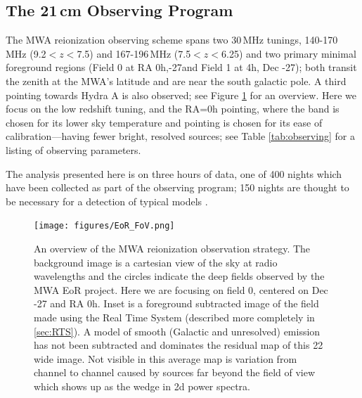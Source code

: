 \documentclass[twolcolumn,iop]{emulateapj}
\begin{document}
\subsection{The 21\,cm Observing Program}
The MWA reionization observing scheme spans two 30\,MHz tunings, 140-170\,MHz (9.2$<z<$7.5) and 167-196\,MHz (7.5$<z<$6.25) and two primary minimal foreground regions (Field 0 at RA 0h,-27\arcdeg and Field 1 at 4h, Dec -27\arcdeg); both transit the zenith at the MWA's  latitude and are near the south galactic pole. A third pointing towards Hydra A is also observed; see Figure \ref{fig:fields} for an overview. Here we focus on the low redshift tuning, and the RA=0h pointing, where the band is chosen for its lower sky temperature and pointing is chosen for its ease of calibration---having fewer bright, resolved sources; see Table \ref{tab:observing} for a listing of observing parameters.

The analysis presented here is on three hours of data, one of 400 nights which have been collected as part of the observing program; 150 nights are thought to be necessary for a detection of typical models \citep{Beardsley:2013p9952}.

\begin{figure}[htbp]
\begin{center}
\texttt{[image: figures/EoR\_FoV.png]}
\caption{An overview of the MWA reionization observation strategy. The background image is a cartesian view of the sky at radio wavelengths and the circles indicate the deep fields observed by the MWA EoR project.  Here we are focusing on field 0, centered on Dec -27\arcdeg{} and RA 0h. Inset is a foreground subtracted image of the field made using the Real Time System (described more completely in \ref{sec:RTS}). A model of smooth (Galactic and unresolved) emission has not been subtracted and dominates the residual map of this 22\arcdeg{} wide image. Not visible in this average map is variation from channel to channel caused by sources far beyond the field of view which shows up as the wedge in 2d power spectra.}
\label{fig:fields}
\end{center}
\end{figure}

\end{document}
